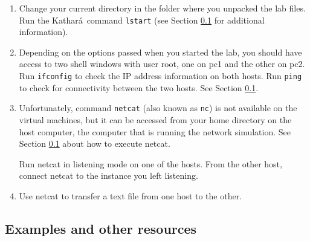 \documentclass[12pt]{book}
\newcommand{\kathara}{Kathar\'a}
\begin{document}
\begin{enumerate}[label=(\arabic*)]
\item Change your current directory in the folder where you unpacked
  the lab files. Run the \kathara\ command
  \verb$lstart$ (see Section \ref{examples.lab0} for additional
    information).

  \item Depending on the options passed when you started the lab, you
    should have access to two shell windows with user root, one on pc1
    and the other on pc2. Run \verb$ifconfig$ to check the IP address
    information on both hosts. Run \verb$ping$ to check for
    connectivity between the two hosts. See Section
    \ref{examples.lab0}.

  \item Unfortunately, command \verb$netcat$ (also known as \verb$nc$)
    is not available on the virtual machines, but it can be accessed
    from your home directory on the host computer, the computer that
    is running the network simulation. See Section \ref{examples.lab0}
    about how to execute netcat.

    Run netcat in listening mode on one of the hosts. From the other
    host, connect netcat to the instance you left listening.

  \item Use netcat to transfer a text file from one host to the
    other. 
\end{enumerate}



\subsection{Examples and other resources}\label{examples.lab0}
\end{document}

